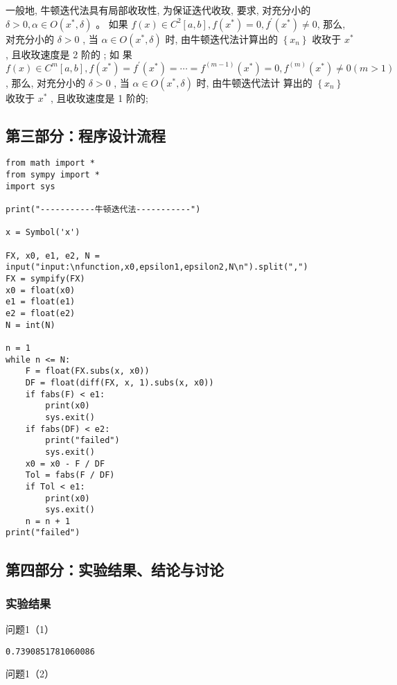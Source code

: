 \documentclass[a4paper,zihao=4,UTF8]{ctexart}
\begin{document}
一般地, 牛顿迭代法具有局部收玫性, 为保证迭代收玫, 要求, 对充分小的  $\delta>0 ,  \alpha \in O\left(x^{*}, \delta\right)$  。
如果  $f(x) \in C^{2}[a, b], f\left(x^{*}\right)=0, f^{\prime}\left(x^{*}\right) \neq 0 $,
那么, 对充分小的  $\delta>0$ , 当  $\alpha \in O\left(x^{*}, \delta\right) $ 时, 由牛顿迭代法计算出的 $ \left\{x_{n}\right\}$  收玫于 $ x^{*} $, 且收玫速度是 2 阶的 ;
如 果  $f(x) \in C^{m}[a, b], f\left(x^{*}\right)=f^{\prime}\left(x^{*}\right)=\cdots=f^{(m-1)}\left(x^{*}\right)=0 ,  f^{(m)}\left(x^{*}\right) \neq 0(m>1)$ , 那么, 对充分小的 $ \delta>0$ , 当  $\alpha \in O\left(x^{*}, \delta\right)$  时, 由牛顿迭代法计 算出的  $\left\{x_{n}\right\}$  收玫于  $x^{*}$ , 且收玫速度是 1 阶的;


\subsection*{第三部分：程序设计流程}

\begin{lstlisting}
from math import *
from sympy import *
import sys

print("-----------牛顿迭代法-----------")

x = Symbol('x')

FX, x0, e1, e2, N = input("input:\nfunction,x0,epsilon1,epsilon2,N\n").split(",")
FX = sympify(FX)
x0 = float(x0)
e1 = float(e1)
e2 = float(e2)
N = int(N)

n = 1
while n <= N:
	F = float(FX.subs(x, x0))
	DF = float(diff(FX, x, 1).subs(x, x0))
	if fabs(F) < e1:
		print(x0)
		sys.exit()
	if fabs(DF) < e2:
		print("failed")
		sys.exit()
	x0 = x0 - F / DF
	Tol = fabs(F / DF)
	if Tol < e1:
		print(x0)
		sys.exit()
	n = n + 1
print("failed")	
\end{lstlisting}

\subsection*{第四部分：实验结果、结论与讨论}

\subsubsection*{实验结果}

问题1（1）

\begin{lstlisting}
0.7390851781060086
\end{lstlisting}

问题1（2）
\end{document}
